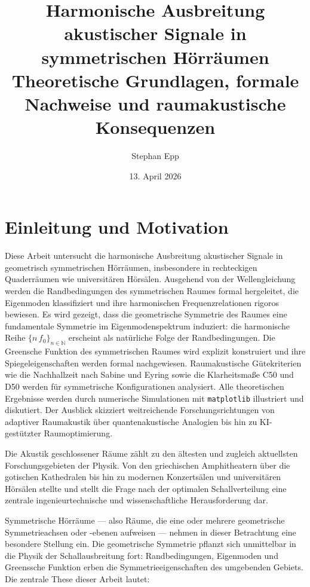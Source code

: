 ﻿\documentclass[12pt, a4paper]{article}
\title{\textbf{Harmonische Ausbreitung akustischer Signale in symmetrischen Hörräumen}\\
Theoretische Grundlagen, formale Nachweise und raumakustische Konsequenzen}
\date{13. April 2026}
\author{Stephan Epp}
\theoremstyle{definition}
\theoremstyle{remark}
\newcommand{\N}{\mathbb{N}}
\begin{document}
\maketitle
\tableofcontents
\newpage

\section{Einleitung und Motivation}
  Diese Arbeit untersucht die harmonische Ausbreitung akustischer Signale in geometrisch
symmetrischen Hörräumen, insbesondere in rechteckigen Quaderräumen wie universitären
Hörsälen. Ausgehend von der Wellengleichung werden die Randbedingungen des
symmetrischen Raumes formal hergeleitet, die Eigenmoden klassifiziert und
ihre harmonischen Frequenzrelationen rigoros bewiesen. Es wird gezeigt, dass
die geometrische Symmetrie des Raumes eine fundamentale Symmetrie im Eigenmodenspektrum
induziert: die harmonische Reihe $\{n\,f_0\}_{n\in\N}$ erscheint als
natürliche Folge der Randbedingungen. Die Greensche Funktion des symmetrischen
Raumes wird explizit konstruiert und ihre Spiegeleigenschaften werden formal
nachgewiesen. Raumakustische Gütekriterien wie die Nachhallzeit nach Sabine und
Eyring sowie die Klarheitsmaße C50 und D50 werden für symmetrische Konfigurationen
analysiert. Alle theoretischen Ergebnisse werden durch numerische Simulationen
mit \texttt{matplotlib} illustriert und diskutiert. Der Ausblick skizziert
weitreichende Forschungsrichtungen von adaptiver Raumakustik über
quantenakustische Analogien bis hin zu KI-gestützter Raumoptimierung.

Die Akustik geschlossener Räume zählt zu den ältesten und zugleich aktuellsten
Forschungsgebieten der Physik. Von den griechischen Amphitheatern über
die gotischen Kathedralen bis hin zu modernen Konzertsälen und universitären
Hörsälen stellte und stellt die Frage nach der optimalen Schallverteilung
eine zentrale ingenieurtechnische und wissenschaftliche Herausforderung dar.

Symmetrische Hörräume --- also Räume, die eine oder mehrere geometrische
Symmetrieachsen oder -ebenen aufweisen --- nehmen in dieser Betrachtung
eine besondere Stellung ein. Die geometrische Symmetrie pflanzt sich
unmittelbar in die Physik der Schallausbreitung fort: Randbedingungen,
Eigenmoden und Greenssche Funktion erben die Symmetrieeigenschaften des
umgebenden Gebiets. Die zentrale These dieser Arbeit lautet:
\end{document}
